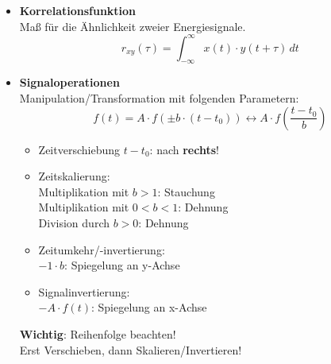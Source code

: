 \begin{itemize}
      \item{\textbf{Korrelationsfunktion}}\\
          {\small Ma{\ss} f\"ur die \"Ahnlichkeit
          zweier Energiesignale.}
              \[
                  r_{xy}(\tau) = \int_{-\infty}^{\infty}x(t)\cdot y(t+\tau) \, dt
              \]
      \item{\textbf{Signaloperationen}}\\
        {\small Manipulation/Transformation mit folgenden Parametern:}
            \[ \boxed{
				f(t) = A \cdot f(\pm b \cdot (t - t_0)) \leftrightarrow A \cdot f\left(\frac{t - t_0}{b}\right)
				}
			\]
		 \renewcommand{\labelitemii}{$\bullet$}
          \begin{itemize}
              \item{Zeitverschiebung $t-t_0$: nach \textbf{rechts}}!

              \item{Zeitskalierung:\\
              	Multiplikation mit $b>1$: Stauchung \\
              	Multiplikation mit $0<b<1$: Dehnung \\
              	Division durch $b>0$: Dehnung}

              \item{Zeitumkehr/-invertierung:\\ $-1 \cdot b$: Spiegelung an y-Achse}
              \item{Signalinvertierung:\\
              $-A\cdot f(t)$: Spiegelung an x-Achse}
              
          \end{itemize}
          \textbf{Wichtig}: Reihenfolge beachten!\\
          Erst Verschieben, dann Skalieren/Invertieren!
  \end{itemize}
